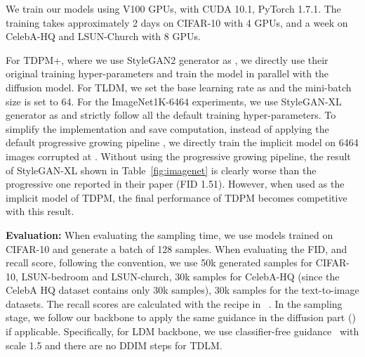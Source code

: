 \documentclass{article} \usepackage{iclr2023_conference,times}
\theoremstyle{plain}
\theoremstyle{definition}
\theoremstyle{remark}
\begin{document}
{We train our models using V100 GPUs, with CUDA 10.1, PyTorch 1.7.1. The training takes approximately 2 days on CIFAR-10 with 4 GPUs, and a week on CelebA-HQ and LSUN-Church with 8 GPUs.   


\begin{table}[h]
\vspace{-5mm}
\centering
\caption{Optimization hyper-parameters.}\vspace{-3mm}
\label{tab:optimizer}
\vspace{-3mm}
\end{table}

For TDPM+, where we use StyleGAN2 generator as , we directly use their original training hyper-parameters and train the model in parallel with the diffusion model. For TLDM, we set the base learning rate as  and the mini-batch size is set to 64.
{For the ImageNet1K-6464 experiments, we use StyleGAN-XL generator as  and strictly follow all the default training hyper-parameters. To simplify the implementation and save computation, instead of applying the default progressive growing pipeline , we directly train the implicit model on 6464 images corrupted at . Without using the progressive growing pipeline, the result of StyleGAN-XL shown in Table~\ref{fig:imagenet} is clearly worse than the progressive one reported in their paper (FID 1.51). However, when used as the implicit model of TDPM, the final performance of TDPM becomes competitive with this result. 
}

\textbf{Evaluation:} When evaluating the sampling time, we use models trained on CIFAR-10 and generate a batch of 128 samples. When evaluating the  FID, and recall score, following the convention, we use 50k generated samples for CIFAR-10, LSUN-bedroom and LSUN-church, 30k samples for CelebA-HQ (since the CelebA HQ dataset contains only 30k samples), 30k samples for the text-to-image datasets. The recall scores are calculated with the recipe in ~\citet{kynkaanniemi2019improved}. In the sampling stage, we follow our backbone to apply the same guidance in the diffusion part () if applicable. Specifically, for LDM backbone, we use classifier-free guidance~\citep{ho2022classifier} with scale 1.5 and there are no DDIM steps for TDLM. 

}
\end{document}
